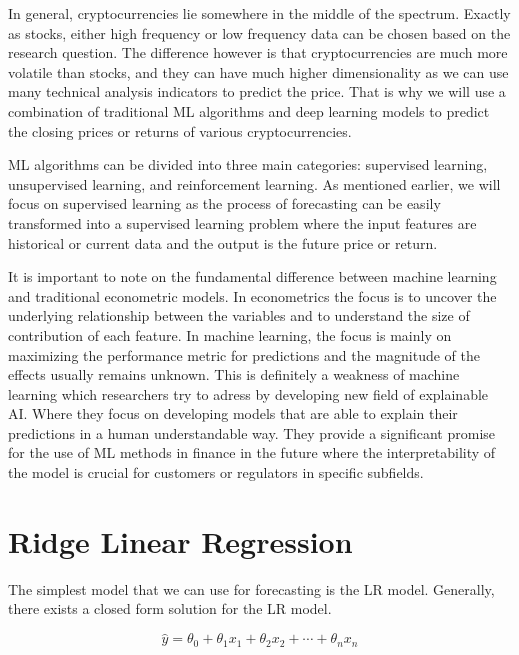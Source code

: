 In general, cryptocurrencies
lie somewhere in the middle of the spectrum. Exactly as stocks, either high frequency or low frequency
data can be chosen based on the research question. The difference however is that cryptocurrencies 
are much more volatile than stocks, and they can have much higher dimensionality as we can use 
many technical analysis indicators to predict the price. 
That is why we will use a combination of
traditional \ac{ML} algorithms and deep learning models to predict the 
closing prices or returns of
various cryptocurrencies.

\ac{ML} algorithms can be divided into three main categories: supervised learning, unsupervised learning, and reinforcement learning.
As mentioned earlier, we will focus on supervised learning as the process of forecasting
can be easily transformed into a supervised learning problem where the input features
are historical or current data and the output is the future price or return.


It is important to note on the fundamental difference between machine learning and
traditional econometric models. In econometrics the focus is to uncover the underlying
relationship between the variables and to understand the size of contribution of each
feature. In machine learning, the focus is mainly on maximizing the performance metric for predictions and 
the magnitude of the effects usually remains unknown. This is definitely a weakness of machine learning
which researchers try to adress by developing new field of explainable \ac{AI}. 
Where they focus on developing models that are able to explain their predictions in a human understandable way.
They provide a significant promise for the use of \ac{ML} methods in finance in the future
where the interpretability of the model is crucial for customers or regulators in specific subfields.





\section{Ridge Linear Regression}
The simplest model that we can use for forecasting is the \acl{LR} model.
Generally, there exists a closed form solution for the \ac{LR} model.

\begin{equation}
    \hat{y} = \theta_0 + \theta_1 x_1 + \theta_2 x_2 + \cdots + \theta_n x_n
\end{equation}


